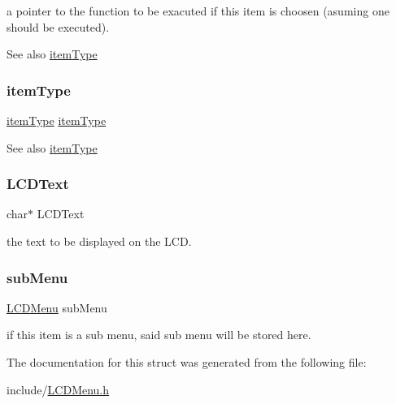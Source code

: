 a pointer to the function to be exacuted if this item is choosen (asuming one should be executed).

\begin{DoxySeeAlso}{See also}
\hyperlink{struct_l_c_d_item_ad628598d6019c8248dd0b161654253c8}{item\+Type} 
\end{DoxySeeAlso}
\hypertarget{struct_l_c_d_item_ad628598d6019c8248dd0b161654253c8}{}\label{struct_l_c_d_item_ad628598d6019c8248dd0b161654253c8} 
\subsubsection{\texorpdfstring{item\+Type}{itemType}}
{\footnotesize\ttfamily \hyperlink{_l_c_d_menu_8h_a090b740ab4ce239469ae5916e79846fa}{item\+Type} \hyperlink{_l_c_d_menu_8h_a090b740ab4ce239469ae5916e79846fa}{item\+Type}}

\begin{DoxySeeAlso}{See also}
\hyperlink{struct_l_c_d_item_ad628598d6019c8248dd0b161654253c8}{item\+Type} 
\end{DoxySeeAlso}
\hypertarget{struct_l_c_d_item_a3265d5a814cae9c1ce47d7e878c45c64}{}\label{struct_l_c_d_item_a3265d5a814cae9c1ce47d7e878c45c64} 
\subsubsection{\texorpdfstring{L\+C\+D\+Text}{LCDText}}
{\footnotesize\ttfamily char$\ast$ L\+C\+D\+Text}

the text to be displayed on the L\+CD. \hypertarget{struct_l_c_d_item_af3cbf3c417e8237330132b5ab5448b16}{}\label{struct_l_c_d_item_af3cbf3c417e8237330132b5ab5448b16} 
\subsubsection{\texorpdfstring{sub\+Menu}{subMenu}}
{\footnotesize\ttfamily \hyperlink{struct_l_c_d_menu}{L\+C\+D\+Menu} sub\+Menu}

if this item is a sub menu, said sub menu will be stored here. 

The documentation for this struct was generated from the following file\+:\begin{DoxyCompactItemize}
\item 
include/\hyperlink{_l_c_d_menu_8h}{L\+C\+D\+Menu.\+h}\end{DoxyCompactItemize}
